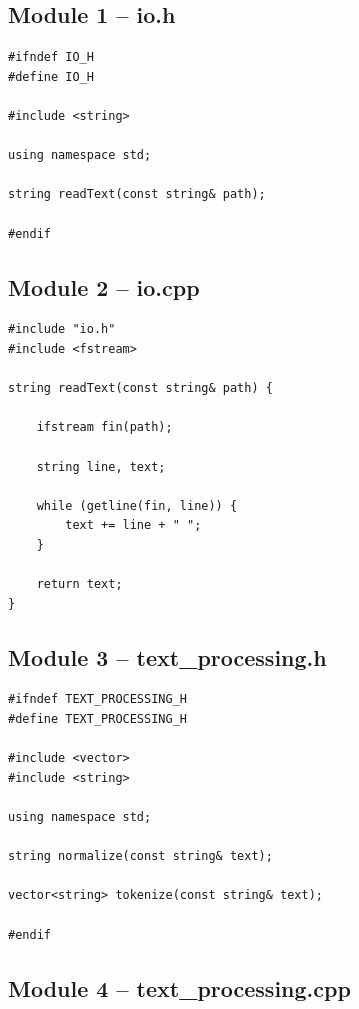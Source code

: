 \subsection{Module 1 -- io.h}

\begin{lstlisting}
#ifndef IO_H
#define IO_H

#include <string>

using namespace std;

string readText(const string& path);

#endif
\end{lstlisting}

\subsection{Module 2 -- io.cpp}

\begin{lstlisting}
#include "io.h"
#include <fstream>

string readText(const string& path) {

    ifstream fin(path);

    string line, text;

    while (getline(fin, line)) {
        text += line + " ";
    }

    return text;
}
\end{lstlisting}

\subsection{Module 3 -- text\_processing.h}

\begin{lstlisting}
#ifndef TEXT_PROCESSING_H
#define TEXT_PROCESSING_H

#include <vector>
#include <string>

using namespace std;

string normalize(const string& text);

vector<string> tokenize(const string& text);

#endif
\end{lstlisting}

\subsection{Module 4 -- text\_processing.cpp}

